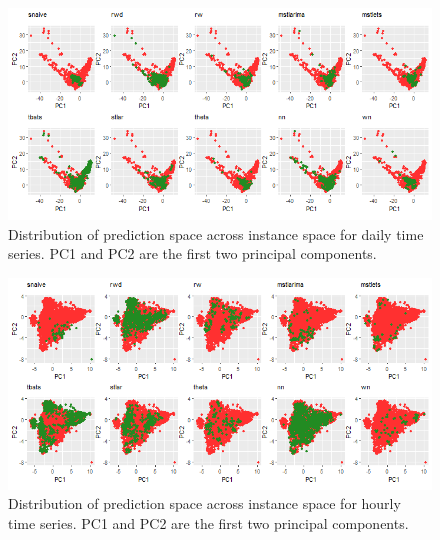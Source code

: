 \documentclass[11pt,a4paper,]{article}
\theoremstyle{definition}
\theoremstyle{definition}
\theoremstyle{definition}
\theoremstyle{remark}
\begin{document}
\clearpage

\begin{figure}[h]

{\centering \includegraphics{figures/pcadaily-1} 

}

\caption{Distribution of prediction space across instance space for daily time series. PC1 and PC2 are the first two principal components.}\label{fig:pcadaily}
\end{figure}

\begin{figure}[h]

{\centering \includegraphics{figures/pcahourly-1} 

}

\caption{Distribution of prediction space across instance space for hourly time series. PC1 and PC2 are the first two principal components.}\label{fig:pcahourly}
\end{figure}

\clearpage

\printbibliography[title=References]
\end{document}
